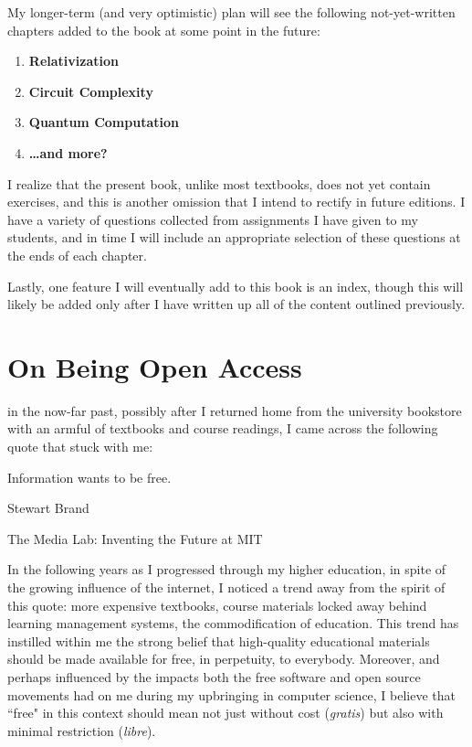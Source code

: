 My longer-term (and very optimistic) plan will see the following not-yet-written chapters added to the book at some point in the future:
\begin{enumerate}
\item[\phantom{\textbf{12}}] \textbf{Relativization}
\item[\phantom{\textbf{13}}] \textbf{Circuit Complexity}
\item[\phantom{\textbf{14}}] \textbf{Quantum Computation}
\item[\phantom{\textbf{15}}] \textbf{\dots and more?}
\end{enumerate}

I realize that the present book, unlike most textbooks, does not yet contain exercises, and this is another omission that I intend to rectify in future editions. I have a variety of questions collected from assignments I have given to my students, and in time I will include an appropriate selection of these questions at the ends of each chapter.

Lastly, one feature I will eventually add to this book is an index, though this will likely be added only after I have written up all of the content outlined previously.

\section*{On Being Open Access}

 in the now-far past, possibly after I returned home from the university bookstore with an armful of textbooks and course readings, I came across the following quote that stuck with me:

\epigraph{Information wants to be free.}{Stewart Brand}{The Media Lab: Inventing the Future at MIT}{}
\vspace{1em}

\noindent
In the following years as I progressed through my higher education, in spite of the growing influence of the internet, I noticed a trend away from the spirit of this quote: more expensive textbooks, course materials locked away behind learning management systems, the commodification of education. This trend has instilled within me the strong belief that high-quality educational materials should be made available for free, in perpetuity, to everybody. Moreover, and perhaps influenced by the impacts both the free software and open source movements had on me during my upbringing in computer science, I believe that ``free" in this context should mean not just without cost (\textit{gratis}) but also with minimal restriction (\textit{libre}).

